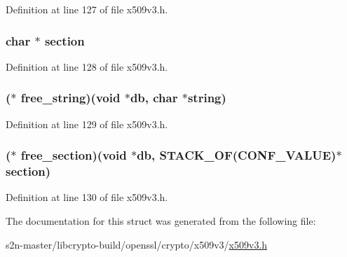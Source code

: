 Definition at line 127 of file x509v3.\+h.

\subsubsection[{\texorpdfstring{section}{section}}]{\setlength{\rightskip}{0pt plus 5cm}char $\ast$ section}\hypertarget{struct_x509_v3___c_o_n_f___m_e_t_h_o_d__st_a8f787b64195a3ec85f95102bd6824ca0}{}\label{struct_x509_v3___c_o_n_f___m_e_t_h_o_d__st_a8f787b64195a3ec85f95102bd6824ca0}


Definition at line 128 of file x509v3.\+h.

\subsubsection[{\texorpdfstring{free\+\_\+string}{free_string}}]{($\ast$ free\+\_\+string)({\bf void} $\ast$db, char $\ast$string)}\hypertarget{struct_x509_v3___c_o_n_f___m_e_t_h_o_d__st_a82bd27b8f3c17e474e92e20a8c55a143}{}\label{struct_x509_v3___c_o_n_f___m_e_t_h_o_d__st_a82bd27b8f3c17e474e92e20a8c55a143}


Definition at line 129 of file x509v3.\+h.

\subsubsection[{\texorpdfstring{free\+\_\+section}{free_section}}]{($\ast$ free\+\_\+section)({\bf void} $\ast$db, {\bf S\+T\+A\+C\+K\+\_\+\+OF}({\bf C\+O\+N\+F\+\_\+\+V\+A\+L\+UE})$\ast${\bf section})}\hypertarget{struct_x509_v3___c_o_n_f___m_e_t_h_o_d__st_af854e7c24f99513ec27f166745a207b3}{}\label{struct_x509_v3___c_o_n_f___m_e_t_h_o_d__st_af854e7c24f99513ec27f166745a207b3}


Definition at line 130 of file x509v3.\+h.



The documentation for this struct was generated from the following file\+:\begin{DoxyCompactItemize}
\item 
s2n-\/master/libcrypto-\/build/openssl/crypto/x509v3/\hyperlink{crypto_2x509v3_2x509v3_8h}{x509v3.\+h}\end{DoxyCompactItemize}
